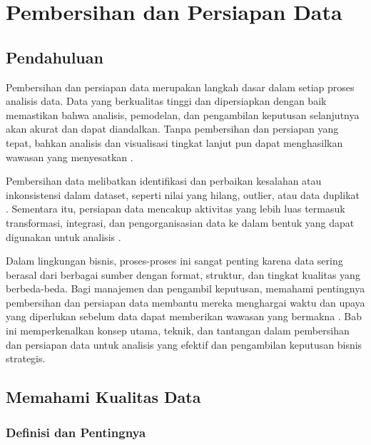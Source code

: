 \chapter{Pembersihan dan Persiapan Data}

\section{Pendahuluan}

Pembersihan dan persiapan data merupakan langkah dasar dalam setiap proses analisis data. Data yang berkualitas tinggi dan dipersiapkan dengan baik memastikan bahwa analisis, pemodelan, dan pengambilan keputusan selanjutnya akan akurat dan dapat diandalkan. Tanpa pembersihan dan persiapan yang tepat, bahkan analisis dan visualisasi tingkat lanjut pun dapat menghasilkan wawasan yang menyesatkan \cite{kim2020data}.

Pembersihan data melibatkan identifikasi dan perbaikan kesalahan atau inkonsistensi dalam dataset, seperti nilai yang hilang, outlier, atau data duplikat \cite{rahm2000data}. Sementara itu, persiapan data mencakup aktivitas yang lebih luas termasuk transformasi, integrasi, dan pengorganisasian data ke dalam bentuk yang dapat digunakan untuk analisis \cite{kotu2014predictive}.

Dalam lingkungan bisnis, proses-proses ini sangat penting karena data sering berasal dari berbagai sumber dengan format, struktur, dan tingkat kualitas yang berbeda-beda. Bagi manajemen dan pengambil keputusan, memahami pentingnya pembersihan dan persiapan data membantu mereka menghargai waktu dan upaya yang diperlukan sebelum data dapat memberikan wawasan yang bermakna \cite{gandomi2015beyond}. Bab ini memperkenalkan konsep utama, teknik, dan tantangan dalam pembersihan dan persiapan data untuk analisis yang efektif dan pengambilan keputusan bisnis strategis.

\section{Memahami Kualitas Data}

\subsection{Definisi dan Pentingnya}

